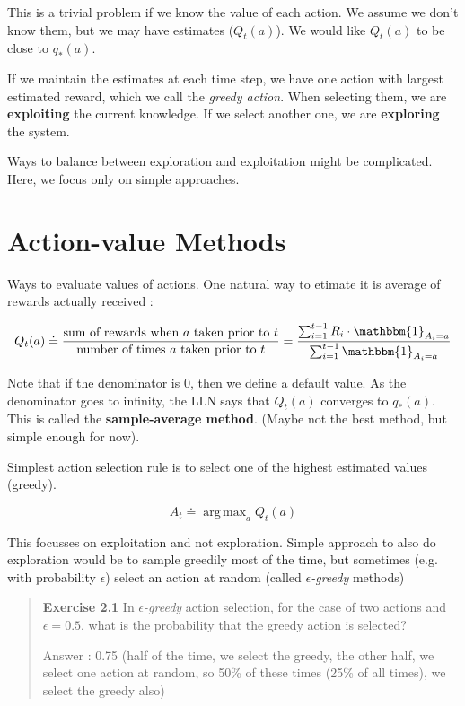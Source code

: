 \documentclass{article}
\DeclareMathOperator*{\argmax}{arg\,max}
\begin{document}
This is a trivial problem if we know the value of each action. We assume we don't know them, but we may have estimates ($Q_t(a)$). We would like  $Q_t(a)$ to be close to $q_*(a)$.

If we maintain the estimates at each time step, we have one action with largest estimated reward, which we call the \textit{greedy action}. When selecting them, we are \textbf{exploiting} the current knowledge. If we select another one, we are \textbf{exploring} the system.

Ways to balance between exploration and exploitation might be complicated. Here, we focus only on simple approaches.

\section{Action-value Methods}

Ways to evaluate values of actions. One natural way to etimate it is average of rewards actually received :

\begin{equation}
Q_t(a) \doteq \frac{\text{sum of rewards when } a \text{ taken prior to } t}{\text{number of times } a \text { taken prior to } t} = \frac{\sum_{i=1}^{t-1} R_i \cdot \mathbbm{1}_{A_i=a}}{\sum_{i=1}^{t-1} \mathbbm{1}_{A_i = a}}
\end{equation}

Note that if the denominator is 0, then we define a default value. As the denominator goes to infinity, the LLN says that $Q_t(a)$ converges to $q_*(a)$. This is called the \textbf{sample-average method}. (Maybe not the best method, but simple enough for now).

Simplest action selection rule is to select one of the highest estimated values (greedy).

\begin{equation}
A_t \doteq \argmax_a Q_t(a)
\end{equation}

This focusses on exploitation and not exploration. Simple approach to also do exploration would be to sample greedily most of the time, but sometimes (e.g. with probability $\epsilon$) select an action at random (called $\epsilon$\textit{-greedy} methods)

\begin{quote}
	\textbf{Exercise 2.1} In $\epsilon$\textit{-greedy} action selection, for the case of two actions and $\epsilon=0.5$, what is the probability that the greedy action is selected?
	
	Answer : 0.75 (half of the time, we select the greedy, the other half, we select one action at random, so 50\% of these times (25\% of all times), we select the greedy also)
\end{quote}
\end{document}
